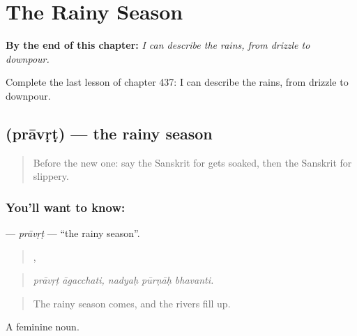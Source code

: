 
\chapter{The Rainy Season}
\label{ch:sa-the-rainy-season}

\begin{chapteropening}
\textbf{By the end of this chapter:} \emph{I can describe the rains, from drizzle to downpour.}

Complete the last lesson of chapter 437: I can describe the rains, from drizzle to downpour.
\end{chapteropening}

\section[\texorpdfstring{\sk{प्रावृट्} (prāvṛṭ)}{प्रावृट् (prāvṛṭ)}]{ (prāvṛṭ) — the rainy season}

\label{lesson:SA-C437-pravrt}



\begin{quote}
Before the new one: say the Sanskrit for gets soaked, then the Sanskrit for slippery.
\end{quote}

\subsection*{You'll want to know: }
\textbf{} — \emph{prāvṛṭ} — \textquotedblleft{}the rainy season\textquotedblright{}.

\begin{quote}
 ,   
\end{quote}

\begin{quote}
\emph{prāvṛṭ āgacchati, nadyaḥ pūrṇāḥ bhavanti.}
\end{quote}

\begin{quote}
The rainy season comes, and the rivers fill up.
\end{quote}

A feminine noun.

